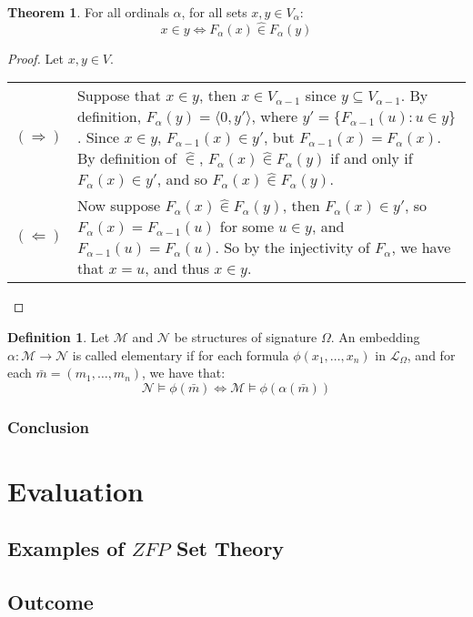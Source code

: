 \documentclass[11pt]{report}
\newcommand{\pair}[2]{\langle #1,#2 \rangle}
\newcommand{\zin}{\mathrel{\widehat{\in}}}
\theoremstyle{definition}
\theoremstyle{theorem}
\theoremstyle{lemma}
\newtheorem{definition}{Definition}[section]
\newtheorem{theorem}{Theorem}[section]
\begin{document}
\begin{theorem} For all ordinals $\alpha$, for all sets $x,y\in V_{\alpha}$:
  $$x\in y \Leftrightarrow F_\alpha(x) \zin F_\alpha(y)$$
\begin{proof} Let $x,y\in V$. \hspace{1mm} \\

  \begin{tabular}{p{7mm} p{11.5cm}}
    $(\Rightarrow)$ \rule{0pt}{10ex} &
    Suppose that $x\in y$, then $x\in V_{\alpha-1}$ since $y\subseteq V_{\alpha-1}$.
    By definition, $F_\alpha(y) = \pair{0}{y'}$, where $y' = \{F_{\alpha-1}(u) : u\in y\}$.
    Since $x\in y$, $F_{\alpha-1}(x)\in y'$, but $F_{\alpha-1}(x)=F_\alpha(x)$.
    By definition of $\zin$, $F_{\alpha}(x)\zin F_\alpha(y)$ if and only if $F_\alpha(x) \in y'$, and so $F_\alpha(x) \zin F_\alpha(y)$.
    \\

    $(\Leftarrow)$ &
    Now suppose $F_\alpha(x) \zin F_\alpha(y)$, then $F_\alpha(x) \in y'$, so $F_\alpha(x) = F_{\alpha-1}(u)$ for some $u\in y$, and $F_{\alpha-1}(u) = F_{\alpha}(u)$.
    So by the injectivity of $F_\alpha$, we have that $x=u$, and thus $x\in y$.
  \end{tabular}
\end{proof}
\end{theorem}

\begin{definition} Let $\mathcal{M}$ and $\mathcal{N}$ be structures of signature $\Omega$.
An embedding $\alpha: \mathcal{M} \to \mathcal{N}$ is called elementary if for each formula $\phi(x_1,\ldots,x_n)$ in $\mathcal{L}_\Omega$, and for each $\bar{m} = (m_1,\ldots,m_n)$, we have that:
$$\mathcal N \vDash \phi(\bar m) \Leftrightarrow \mathcal M \vDash \phi(\alpha(\bar m))$$
\end{definition}
\subsection{Conclusion}

\chapter{Evaluation}
\section{Examples of $\mathit{ZFP}$ Set Theory}
\section{Outcome}
\end{document}
